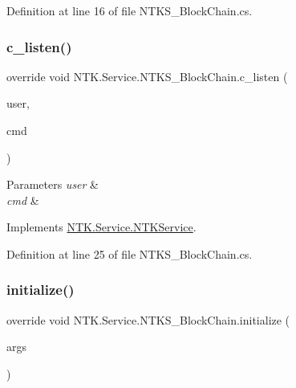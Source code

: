 Definition at line 16 of file N\+T\+K\+S\+\_\+\+Block\+Chain.\+cs.

\mbox{\label{class_n_t_k_1_1_service_1_1_n_t_k_s___block_chain_ab8f7f1e5874fb416928cf2fd2743be83}} 
\subsubsection{\texorpdfstring{c\_listen()}{c\_listen()}}
{\footnotesize\ttfamily override void N\+T\+K.\+Service.\+N\+T\+K\+S\+\_\+\+Block\+Chain.\+c\+\_\+listen (\begin{DoxyParamCaption}\item[{\mbox{\hyperlink{class_n_t_k_1_1_n_t_k_user}{N\+T\+K\+User}}}]{user,  }\item[{String}]{cmd }\end{DoxyParamCaption})\hspace{0.3cm}{\ttfamily [virtual]}}






\begin{DoxyParams}{Parameters}
{\em user} & \\
\hline
{\em cmd} & \\
\hline
\end{DoxyParams}


Implements \mbox{\hyperlink{class_n_t_k_1_1_service_1_1_n_t_k_service_a5f591a8d31f2e2b01fc47a17a4102574}{N\+T\+K.\+Service.\+N\+T\+K\+Service}}.



Definition at line 25 of file N\+T\+K\+S\+\_\+\+Block\+Chain.\+cs.

\mbox{\label{class_n_t_k_1_1_service_1_1_n_t_k_s___block_chain_aa2ffcd0f46fc3a1dc9b5e4f9da7564c8}} 
\subsubsection{\texorpdfstring{initialize()}{initialize()}}
{\footnotesize\ttfamily override void N\+T\+K.\+Service.\+N\+T\+K\+S\+\_\+\+Block\+Chain.\+initialize (\begin{DoxyParamCaption}\item[{params object \mbox{[}$\,$\mbox{]}}]{args }\end{DoxyParamCaption})}



